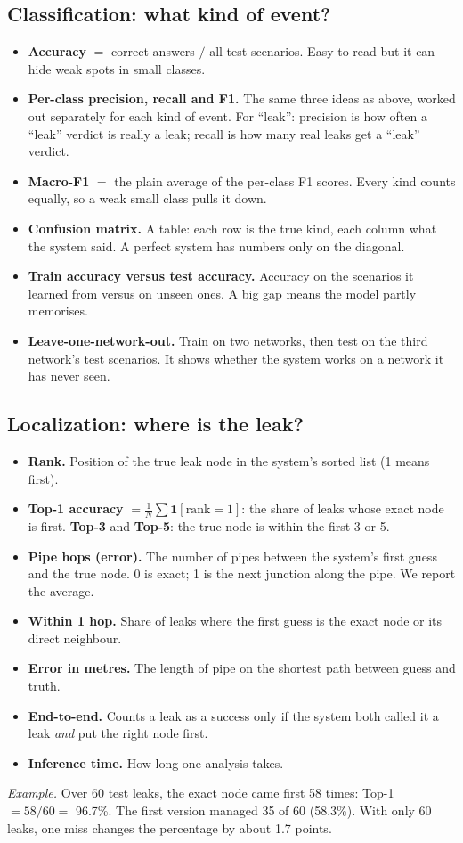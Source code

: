 \documentclass[11pt,a4paper]{article}
\begin{document}
\subsection{Classification: what kind of event?}
\begin{itemize}[itemsep=3pt]
\item \textbf{Accuracy} $=$ correct answers $/$ all test scenarios. Easy to read but it can hide weak spots in small classes.
\item \textbf{Per-class precision, recall and F1.} The same three ideas as above, worked out separately for each kind of event. For ``leak'': precision is how often a ``leak'' verdict is really a leak; recall is how many real leaks get a ``leak'' verdict.
\item \textbf{Macro-F1} $=$ the plain average of the per-class F1 scores. Every kind counts equally, so a weak small class pulls it down.
\item \textbf{Confusion matrix.} A table: each row is the true kind, each column what the system said. A perfect system has numbers only on the diagonal.
\item \textbf{Train accuracy versus test accuracy.} Accuracy on the scenarios it learned from versus on unseen ones. A big gap means the model partly memorises.
\item \textbf{Leave-one-network-out.} Train on two networks, then test on the third network's test scenarios. It shows whether the system works on a network it has never seen.
\end{itemize}

\subsection{Localization: where is the leak?}
\begin{itemize}[itemsep=3pt]
\item \textbf{Rank.} Position of the true leak node in the system's sorted list (1 means first).
\item \textbf{Top-1 accuracy} $=\frac1N\sum\mathbf 1[\text{rank}=1]$: the share of leaks whose exact node is first. \textbf{Top-3} and \textbf{Top-5}: the true node is within the first 3 or 5.
\item \textbf{Pipe hops (error).} The number of pipes between the system's first guess and the true node. 0 is exact; 1 is the next junction along the pipe. We report the average.
\item \textbf{Within 1 hop.} Share of leaks where the first guess is the exact node or its direct neighbour.
\item \textbf{Error in metres.} The length of pipe on the shortest path between guess and truth.
\item \textbf{End-to-end.} Counts a leak as a success only if the system both called it a leak \emph{and} put the right node first.
\item \textbf{Inference time.} How long one analysis takes.
\end{itemize}
\textit{Example.} Over 60 test leaks, the exact node came first 58 times: Top-1 $=58/60=$ 96.7\%. The first version managed 35 of 60 (58.3\%). With only 60 leaks, one miss changes the percentage by about 1.7 points.
\end{document}
